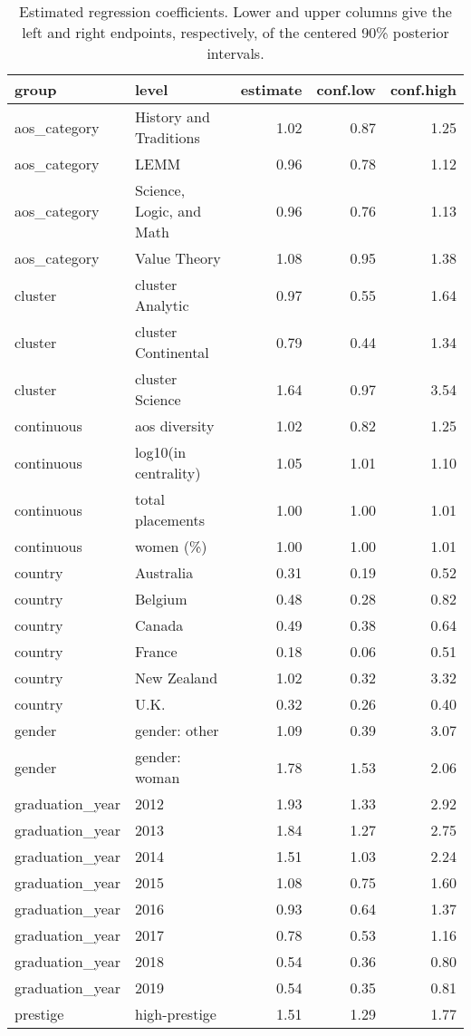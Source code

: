 \begin{table}

\caption{\label{tab:estimates}Estimated regression coefficients.  Lower and upper columns give the left and right endpoints, respectively, of the centered 90\% posterior intervals.}
\centering
\begin{tabular}[t]{llrrr}
\toprule
group & level & estimate & conf.low & conf.high\\
\midrule
aos\_category & History and Traditions & 1.02 & 0.87 & 1.25\\
aos\_category & LEMM & 0.96 & 0.78 & 1.12\\
aos\_category & Science, Logic, and Math & 0.96 & 0.76 & 1.13\\
aos\_category & Value Theory & 1.08 & 0.95 & 1.38\\
cluster & cluster Analytic & 0.97 & 0.55 & 1.64\\
\addlinespace
cluster & cluster Continental & 0.79 & 0.44 & 1.34\\
cluster & cluster Science & 1.64 & 0.97 & 3.54\\
continuous & aos diversity & 1.02 & 0.82 & 1.25\\
continuous & log10(in centrality) & 1.05 & 1.01 & 1.10\\
continuous & total placements & 1.00 & 1.00 & 1.01\\
\addlinespace
continuous & women (\%) & 1.00 & 1.00 & 1.01\\
country & Australia & 0.31 & 0.19 & 0.52\\
country & Belgium & 0.48 & 0.28 & 0.82\\
country & Canada & 0.49 & 0.38 & 0.64\\
country & France & 0.18 & 0.06 & 0.51\\
\addlinespace
country & New Zealand & 1.02 & 0.32 & 3.32\\
country & U.K. & 0.32 & 0.26 & 0.40\\
gender & gender: other & 1.09 & 0.39 & 3.07\\
gender & gender: woman & 1.78 & 1.53 & 2.06\\
graduation\_year & 2012 & 1.93 & 1.33 & 2.92\\
\addlinespace
graduation\_year & 2013 & 1.84 & 1.27 & 2.75\\
graduation\_year & 2014 & 1.51 & 1.03 & 2.24\\
graduation\_year & 2015 & 1.08 & 0.75 & 1.60\\
graduation\_year & 2016 & 0.93 & 0.64 & 1.37\\
graduation\_year & 2017 & 0.78 & 0.53 & 1.16\\
\addlinespace
graduation\_year & 2018 & 0.54 & 0.36 & 0.80\\
graduation\_year & 2019 & 0.54 & 0.35 & 0.81\\
prestige & high-prestige & 1.51 & 1.29 & 1.77\\
\bottomrule
\end{tabular}
\end{table}